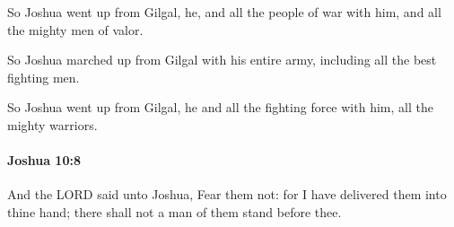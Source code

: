 			\begin{versebox}
					\item[BHS] 
					\item[ASV] So Joshua went up from Gilgal, he, and all the people of war with him, and all the mighty men of valor.
					\item[NIV] So Joshua marched up from Gilgal with his entire army, including all the best fighting men.
					\item[NRSV] So Joshua went up from Gilgal, he and all the fighting force with him, all the mighty warriors.
			\end{versebox}

		\paragraph{Joshua 10:8} %
			\label{JOSHUA-10-8}

			And the LORD said unto Joshua, Fear them not: for I have delivered them into thine hand; there shall not a man of them stand before thee.

